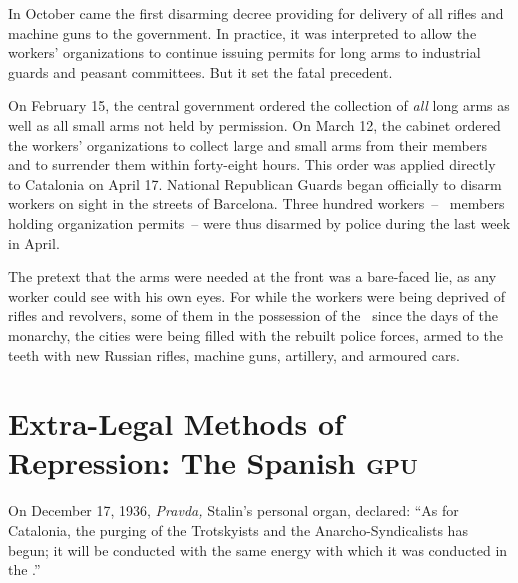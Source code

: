 In October came the first disarming decree providing for delivery of all rifles and machine guns to the government. In practice, it was interpreted to allow the workers’ organizations to continue issuing permits for long arms to industrial guards and peasant committees. But it set the fatal precedent.

On February 15, the central government ordered the collection of \emph{all} long arms as well as all small arms not held by permission. On March 12, the cabinet ordered the workers’ organizations to collect large and small arms from their members and to surrender them within forty-eight hours. This order was applied directly to Catalonia on April 17. National Republican Guards began officially to disarm workers on sight in the streets of Barcelona. Three hundred workers~-- \CNT\ members holding organization permits~-- were thus disarmed by police during the last week in April.

The pretext that the arms were needed at the front was a bare-faced lie, as any worker could see with his own eyes. For while the workers were being deprived of rifles and revolvers, some of them in the possession of the \CNT\ since the days of the monarchy, the cities were being filled with the rebuilt police forces, armed to the teeth with new Russian rifles, machine guns, artillery, and armoured cars.

\newpage

\bigskip

\section[Extra-Legal Methods of Repression]{Extra-Legal Methods of Repression: The Spanish \textsc{gpu}}

On December 17, 1936, \emph{Pravda,} Stalin’s personal organ, declared: ``As for Catalonia, the purging of the Trotskyists and the An\-archo-Syn\-di\-cal\-ists has begun; it will be conducted with the same energy with which it was conducted in the \USSR\kn.''


